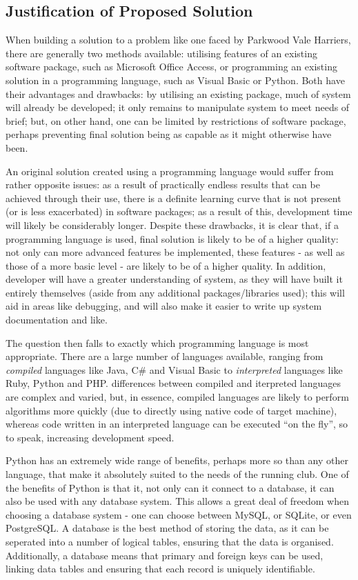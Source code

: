\documentclass{article}[12pt,a4paper]
\begin{document}
\subsection{Justification of Proposed Solution}
When building a solution to a problem like one faced by Parkwood Vale Harriers, there are generally two methods available: utilising features of an existing software package, such as Microsoft Office Access, or programming an existing solution in a programming language, such as Visual Basic or Python. Both have their advantages and drawbacks: by utilising an existing package, much of system will already be developed; it only remains to manipulate system to meet needs of brief; but, on other hand, one can be limited by restrictions of software package, perhaps preventing final solution being as capable as it might otherwise have been.

An original solution created using a programming language would suffer from rather opposite issues: as a result of practically endless results that can be achieved through their use, there is a definite learning curve that is not present (or is less exacerbated) in software packages; as a result of this, development time will likely be considerably longer. Despite these drawbacks, it is clear that, if a programming language is used, final solution is likely to be of a higher quality: not only can more advanced features be implemented, these features - as well as those of a more basic level - are likely to be of a higher quality.  In addition, developer will have a greater understanding of system, as they will have built it entirely themselves (aside from any additional packages/libraries used); this will aid in areas like debugging, and will also make it easier to write up system documentation and like.

The question then falls to exactly which programming language is most appropriate. There are a large number of languages available, ranging from \textit{compiled} languages like Java, C\# and Visual Basic to \textit{interpreted} languages like Ruby, Python and PHP. differences between compiled and iterpreted languages are complex and varied, but, in essence, compiled languages are likely to perform algorithms more quickly (due to directly using native code of target machine), whereas code written in an interpreted language can be executed ``on the fly'', so to speak, increasing development speed. 

Python has an extremely wide range of benefits, perhaps more so than any other language, that make it absolutely suited to the needs of the running club. One of the benefits of Python is that it, not only can it connect to a database, it can also be used with any database system. This allows a great deal of freedom when choosing a database system - one can choose between MySQL, or SQLite, or even PostgreSQL. A database is the best method of storing the data, as it can be seperated into a number of logical tables, ensuring that the data is organised. Additionally, a database means that primary and foreign keys can be used, linking data tables and ensuring that each record is uniquely identifiable.
\end{document}
